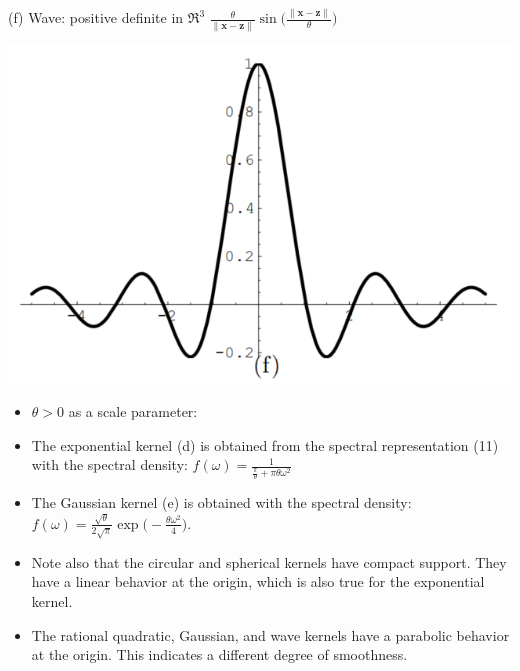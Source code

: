 \documentclass[
  ignorenonframetext,
]{beamer}
\begin{document}
\begin{frame}{}
\protect\hypertarget{section-8}{}
\begin{block}{(f) Wave:}
\protect\hypertarget{f-wave}{}
positive definite in \(\mathfrak R^3\)
\(\frac {\theta} {\|\pmb x - \pmb z\|} \sin \Big(\frac {\|\pmb x - \pmb z\|} \theta \Big)\)

\begin{center}\includegraphics[width=0.5\linewidth]{figure/marc_f2f} \end{center}
\end{block}
\end{frame}

\begin{frame}{}
\protect\hypertarget{section-9}{}
\begin{itemize}
\item
  \(\theta > 0\) as a scale parameter:
\item
  The exponential kernel (d) is obtained from the spectral
  representation (11) with the spectral density:
  \(f(\omega) = \frac 1 {{\frac \pi \theta} + \pi \theta\omega^2}\)
\item
  The Gaussian kernel (e) is obtained with the spectral density:
  \(f(\omega) = \frac {\sqrt \theta} {2\sqrt \pi} \exp \Big(-\frac {\theta\omega^2} 4\Big)\).
\item
  Note also that the circular and spherical kernels have compact
  support. They have a linear behavior at the origin, which is also true
  for the exponential kernel.
\item
  The rational quadratic, Gaussian, and wave kernels have a parabolic
  behavior at the origin. This indicates a different degree of
  smoothness.
\end{itemize}
\end{frame}
\end{document}
